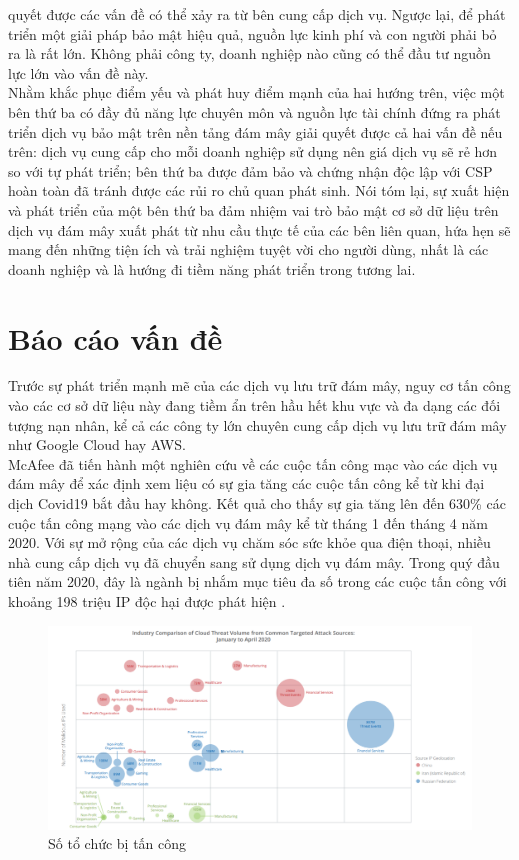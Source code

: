 quyết được các vấn đề có thể xảy ra từ bên cung cấp dịch vụ. Ngược lại, để phát triển
một giải pháp bảo mật hiệu quả, nguồn lực kinh phí và con người phải bỏ ra là rất lớn.
Không phải công ty, doanh nghiệp nào cũng có thể đầu tư nguồn lực lớn vào vấn đề này. \\
\indent Nhằm khắc phục điểm yếu và phát huy điểm mạnh của hai hướng trên, việc một
bên thứ ba có đầy đủ năng lực chuyên môn và nguồn lực tài chính đứng ra phát triển dịch
vụ bảo mật trên nền tảng đám mây giải quyết được cả hai vấn đề nếu trên: dịch vụ cung
cấp cho mỗi doanh nghiệp sử dụng nên giá dịch vụ sẽ rẻ hơn so với tự phát triển; bên thứ
ba được đảm bảo và chứng nhận độc lập với CSP hoàn toàn đã tránh được các rủi ro chủ
quan phát sinh. Nói tóm lại, sự xuất hiện và phát triển của một bên thứ ba đảm nhiệm
vai trò bảo mật cơ sở dữ liệu trên dịch vụ đám mây xuất phát từ nhu cầu thực tế của các
bên liên quan, hứa hẹn sẽ mang đến những tiện ích và trải nghiệm tuyệt vời cho người
dùng, nhất là các doanh nghiệp và là hướng đi tiềm năng phát triển trong tương lai. \\
\section{Báo cáo vấn đề}
Trước sự phát triển mạnh mẽ của các dịch vụ lưu trữ đám mây, nguy cơ tấn công
vào các cơ sở dữ liệu này đang tiềm ẩn trên hầu hết khu vực và đa dạng các đối tượng
nạn nhân, kể cả các công ty lớn chuyên cung cấp dịch vụ lưu trữ đám mây như Google
Cloud hay AWS. \\
\indent McAfee đã tiến hành một nghiên cứu về các cuộc tấn công mạc vào các dịch vụ
đám mây để xác định xem liệu có sự gia tăng các cuộc tấn công kể từ khi đại dịch Covid19 bắt đầu hay không. Kết quả cho thấy sự gia tăng lên đến 630\% các cuộc tấn công
mạng vào các dịch vụ đám mây kể từ tháng 1 đến tháng 4 năm 2020. Với sự mở rộng
của các dịch vụ chăm sóc sức khỏe qua điện thoại, nhiều nhà cung cấp dịch vụ đã chuyển
sang sử dụng dịch vụ đám mây. Trong quý đầu tiên năm 2020, đây là ngành bị nhắm
mục tiêu đa số trong các cuộc tấn công với khoảng 198 triệu IP độc hại được phát hiện \cite{mcafee2020risk}.
\begin{figure}
    \centering
    \includegraphics[scale=0.5]{graphics/chapter-1/chap1-mcafee.png}
    \caption{Số tổ chức bị tấn công \cite{mcafee2020risk}}
    \label{fig:chap1-mcafee}
\end{figure}
